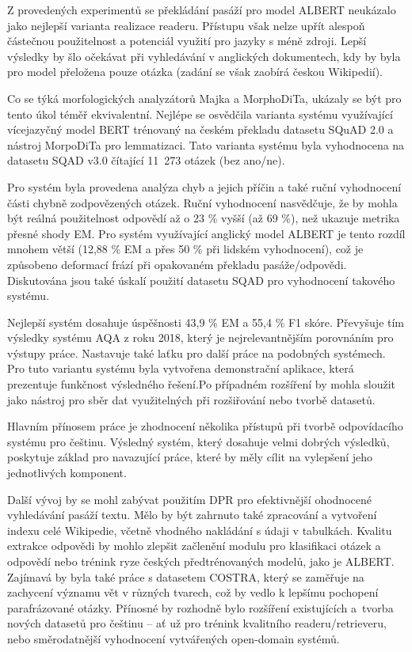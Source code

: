 Z provedených experimentů se překládání pasáží pro model ALBERT neukázalo jako nejlepší varianta realizace readeru. Přístupu však nelze upřít alespoň částečnou použitelnost a potenciál využití pro jazyky s méně zdroji. Lepší výsledky by šlo očekávat při vyhledávání v anglických dokumentech, kdy by byla pro model přeložena pouze otázka (zadání se však zaobírá českou Wikipedií).\par
Co se týká morfologických analyzátorů Majka a MorphoDiTa, ukázaly se být pro tento úkol téměř ekvivalentní. Nejlépe se osvědčila varianta systému využívající vícejazyčný model BERT trénovaný na českém překladu datasetu SQuAD 2.0 a nástroj MorpoDiTa pro lemmatizaci. Tato varianta systému byla vyhodnocena na datasetu SQAD v3.0 čítající 11~273 otázek (bez ano/ne).\par
Pro systém byla provedena analýza chyb a jejich příčin a také ruční vyhodnocení části chybně zodpovězených otázek. Ruční vyhodnocení nasvědčuje, že by mohla být reálná použitelnost odpovědí až o 23 \% vyšší (až 69 \%), než ukazuje metrika přesné shody EM. Pro systém využívající anglický model ALBERT je tento rozdíl mnohem větší (12,88 \% EM a přes 50 \% při lidském vyhodnocení), což je způsobeno deformací frází při opakovaném překladu pasáže/odpovědi. Diskutována jsou také úskalí použití datasetu SQAD pro vyhodnocení takového systému.\par

Nejlepší systém dosahuje úspěšnosti 43,9 \% EM a 55,4 \% F1 skóre. Převyšuje tím výsledky systému AQA z roku 2018, který je nejrelevantnějším porovnáním pro výstupy práce. Nastavuje také laťku pro další práce na podobných systémech. Pro tuto variantu systému byla vytvořena demonstrační aplikace, která prezentuje funkčnost výsledného řešení.\linebreak Po případném rozšíření by mohla sloužit jako nástroj pro sběr dat využitelných při rozšiřování nebo tvorbě datasetů.\par

Hlavním přínosem práce je zhodnocení několika přístupů při tvorbě odpovídacího systému pro češtinu. Výsledný systém, který dosahuje velmi dobrých výsledků, poskytuje základ pro navazující práce, které by měly cílit na vylepšení jeho jednotlivých komponent.\par
\smallskip
Další vývoj by se mohl zabývat použitím DPR pro efektivnější ohodnocené vyhledávání pasáží textu. Mělo by být zahrnuto také zpracování a vytvoření indexu celé Wikipedie, včetně vhodného nakládání s údaji v tabulkách. Kvalitu extrakce odpovědi by mohlo zlepšit začlenění modulu pro klasifikaci otázek a odpovědí nebo trénink ryze českých předtrénovaných modelů, jako je ALBERT. Zajímavá by byla také práce s datasetem COSTRA, který se zaměřuje na zachycení významu vět v různých tvarech, což by vedlo k lepšímu pochopení parafrázované otázky. Přínosné by rozhodně bylo rozšíření existujících a~tvorba nových datasetů pro češtinu -- ať už pro trénink kvalitního readeru/retrieveru, nebo směrodatnější vyhodnocení vytvářených open-domain systémů.
